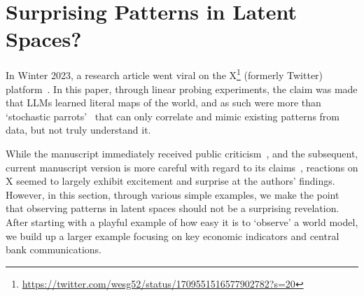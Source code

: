 \documentclass{article}
\theoremstyle{plain}
\theoremstyle{definition}
\theoremstyle{remark}
\begin{document}


\section{Surprising Patterns in Latent Spaces?}\label{patterns-in-latent-spaces-and-how-to-find-them}

In Winter 2023, a research article went viral on the X\footnote{\url{https://twitter.com/wesg52/status/1709551516577902782?s=20}} (formerly Twitter) platform~\cite{gurnee2023languagev1}. In this paper, through linear probing experiments, the claim was made that LLMs learned literal maps of the world, and as such were more than `stochastic parrots'~\cite{bender2021dangers} that can only correlate and mimic existing patterns from data, but not truly understand it.

While the manuscript immediately received public criticism~\cite{marcus2023muddles}, and the subsequent, current manuscript version is more careful with regard to its claims~\cite{gurnee2023languagev2}, reactions on X seemed to largely exhibit excitement and surprise at the authors' findings. However, in this section, through various simple examples, we make the point that observing patterns in latent spaces should not be a surprising revelation. After starting with a playful example of how easy it is to `observe' a world model, we build up a larger example focusing on key economic indicators and central bank communications.

\end{document}
